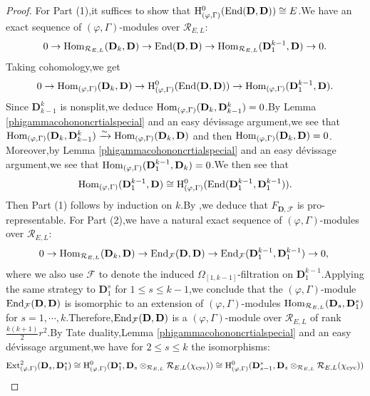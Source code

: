 \documentclass[SecEq,CM,GP]{degruyter-crelle} %
\theoremstyle{plain}
\newcommand{\ccyc}{{\chi_{\mathrm{cyc}}}}
\newcommand{\Dpik}{{\mathbf{D}}}
\newcommand{\EndO}{{\rm End}}
\newcommand{\ext}{{\rm Ext}}
\newcommand{\homo}{{\rm Hom}}
\newcommand{\hH}{{\mathrm{H}}}
\newcommand{\bD}{{\mathbf{D}}}
\newcommand{\cR}{\mathcal R}
\newcommand{\cF}{\mathcal F}
\begin{document}
\begin{proof}For Part (1),\;it suffices to show that $\hH^0_{(\varphi,\Gamma)}(\EndO(\Dpik,\Dpik))\cong E$.\;We have an exact sequence of $(\varphi,\Gamma)$-modules over $\cR_{E,L}$:
\[0\rightarrow \homo_{\cR_{E,L}}(\Dpik_{k},\Dpik)\rightarrow \EndO(\Dpik,\Dpik)\rightarrow \homo_{\cR_{E,L}}(\bD^{k-1}_1,\Dpik) \rightarrow0.\]
Taking cohomology,\;we get
\[0\rightarrow \homo_{(\varphi,\Gamma)}(\Dpik_{k},\Dpik)\rightarrow  \hH^0_{(\varphi,\Gamma)}(\EndO(\Dpik,\Dpik)) \rightarrow  \homo_{(\varphi,\Gamma)}(\bD^{k-1}_1,\Dpik).\]
Since $\Dpik^k_{k-1}$ is nonsplit,\;we deduce $\homo_{(\varphi,\Gamma)}(\Dpik_{k},\Dpik^k_{k-1})=0$.\;By Lemma \ref{phigammacohononcrtialspecial} and an easy d\'{e}vissage argument,\;we see that $\homo_{(\varphi,\Gamma)}(\Dpik_{k},\Dpik^k_{k-1})\xrightarrow{\sim}\homo_{(\varphi,\Gamma)}(\Dpik_{k},\Dpik)$ and then  $\homo_{(\varphi,\Gamma)}(\Dpik_{k},\Dpik)=0$. Moreover,\;by Lemma \ref{phigammacohononcrtialspecial} and an easy d\'{e}vissage argument,\;we see that $\homo_{(\varphi,\Gamma)}(\bD^{k-1}_1,\Dpik_{k})=0$.\;We then see that $$\homo_{(\varphi,\Gamma)}(\bD^{k-1}_1,\Dpik)\cong \hH^0_{(\varphi,\Gamma)}(\EndO(\bD^{k-1}_1,\bD^{k-1}_1)).$$ Then Part (1) follows by induction on $k$.\;By \cite[Proposition 3.4]{chenevier2011infinite},\;we deduce that $F_{\Dpik,\cF}$ is pro-representable. For Part (2),\;we have a natural exact sequence of $(\varphi,\Gamma)$-modules over $\cR_{E,L}$:
\[0\rightarrow \homo_{\cR_{E,L}}(\Dpik_k,\Dpik)\rightarrow \EndO_{\cF}(\Dpik,\Dpik)\rightarrow \EndO_{\cF}(\Dpik^{k-1}_1,\Dpik^{k-1}_1) \rightarrow0,\;\]
where we also use $\cF$ to denote the induced $\Omega_{[1,k-1]}$-filtration on $\Dpik^{k-1}_1$.\;Applying the same strategy to $\Dpik_1^s$ for $1\leq s\leq k-1$,\;we conclude that the $(\varphi,\Gamma)$-module $\EndO_{\cF}(\Dpik,\Dpik)$ is isomorphic to an extension of $(\varphi,\Gamma)$-modules $\homo_{\cR_{E,L}}(\Dpik_{s},\Dpik^{s}_1)$ for $s=1,\cdots,k$.\;Therefore,\;$\EndO_{\cF}(\Dpik,\Dpik)$  is a $(\varphi,\Gamma)$-module over $\cR_{E,L}$ of rank $\frac{k(k+1)}{2}r^2$.\;By Tate duality,\;Lemma \ref{phigammacohononcrtialspecial} and an easy d\'{e}vissage argument,\;we have for  $2\leq s\leq k$ the isomorphisms:
\begin{equation*}
	\begin{aligned}
		\ext^2_{(\varphi,\Gamma)}(\Dpik_{s},\Dpik^{s}_1)&\cong \hH^0_{(\varphi,\Gamma)}(\Dpik^{s}_1,\Dpik_{s}\otimes_{\cR_{E,L}}\cR_{E,L}(\ccyc))\cong \hH^0_{(\varphi,\Gamma)}(\Dpik^{s}_{s-1},\Dpik_{s}\otimes_{\cR_{E,L}}\cR_{E,L}(\ccyc))\\

\end{aligned}
\end{equation*}
\end{proof}
\end{document}
